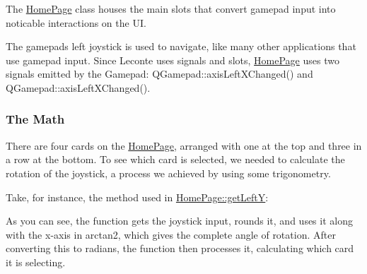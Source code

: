 The \mbox{\hyperlink{classHomePage}{Home\+Page}} class houses the main slots that convert gamepad input into noticable interactions on the UI.

The gamepad\textquotesingle{}s left joystick is used to navigate, like many other applications that use gamepad input. Since Leconte uses signals and slots, \mbox{\hyperlink{classHomePage}{Home\+Page}} uses two signals emitted by the Gamepad\+: {\ttfamily Q\+Gamepad\+::axis\+Left\+X\+Changed()} and {\ttfamily Q\+Gamepad\+::axis\+Left\+X\+Changed()}.

\subsubsection*{The Math}

There are four cards on the \mbox{\hyperlink{classHomePage}{Home\+Page}}, arranged with one at the top and three in a row at the bottom. To see which card is selected, we needed to calculate the rotation of the joystick, a process we achieved by using some trigonometry.

Take, for instance, the method used in {\ttfamily \mbox{\hyperlink{classHomePage_a38c909855e6b1e1a0739642949aa4f9a}{Home\+Page\+::get\+LeftY}}}\+: 
\begin{DoxyCode}{0}
\DoxyCodeLine{\textcolor{preprocessor}{\#include <cmath>}}
\DoxyCodeLine{\}}
\end{DoxyCode}


As you can see, the function gets the joystick input, rounds it, and uses it along with the x-\/axis in arctan2, which gives the complete angle of rotation. After converting this to radians, the function then processes it, calculating which card it is selecting.


